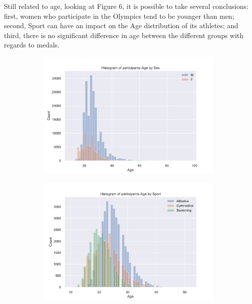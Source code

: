 \documentclass[11pt]{article} %
\begin{document}
Still related to age, looking at Figure 6, it is possible to take several conclusions: first, women who participate in the Olympics tend to be younger than men; second, Sport can have an impact on the Age distribution of its athletes; and third, there is no significant difference in age between the different groups with regards to medals.

\begin{figure}
    \centering
    \begin{subfigure}{.5\textwidth}
    \hspace{-17mm}
    \includegraphics[scale=0.45]{Age_hist_by_Sex.pdf}
    \end{subfigure}%
    \begin{subfigure}{.5\textwidth}
    \includegraphics[scale=0.45]{Age_hist_by_Sport.pdf}
    \end{subfigure}

\end{figure}
\end{document}
